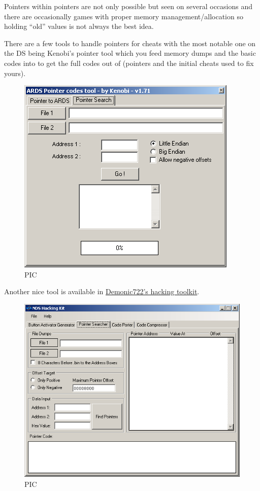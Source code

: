 \documentclass[
]{book}
\begin{document}
Pointers within pointers are not only possible but seen on several occasions and there are occasionally games with proper memory management/allocation so holding ``old'' values is not always the best idea.

There are a few tools to handle pointers for cheats with the most notable one on the DS being Kenobi's pointer tool which you feed memory dumps and the basic codes into to get the full codes out of (pointers and the initial cheats used to fix yours).

\begin{figure}
\centering
\includegraphics{images/209_home_fast6191_romhackingguide_unrenamed_fil___al_borders_romhackingguidendspointerkenobi1.png}
\caption{PIC}
\end{figure}

Another nice tool is available in \href{http://filetrip.net/nds-downloads/applications/latest-nds-hacking-kit-f29363.html}{Demonic722's hacking toolkit}.

\begin{figure}
\centering
\includegraphics{images/210_home_fast6191_romhackingguide_unrenamed_fil___ckguidecheatmakingdemonic722hackingtoolkit1.png}
\caption{PIC}
\end{figure}
\end{document}
